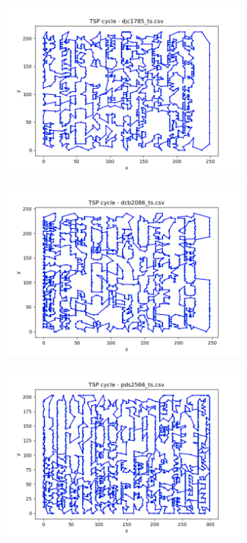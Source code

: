 \documentclass[12pt]{article}
\begin{document}
\begin{figure}[htpb]
\begin{subfigure}[b]{0.475\textwidth}
                \includegraphics[width=\linewidth]{img/djc1785_ts.png}
            \end{subfigure}
            \hfill
            \begin{subfigure}[b]{0.475\textwidth}
                \includegraphics[width=\linewidth]{img/dcb2086_ts.png}
            \end{subfigure}
            \begin{subfigure}[b]{0.475\textwidth}
                \includegraphics[width=\linewidth]{img/pds2566_ts.png}

\end{subfigure}
\end{figure}
\end{document}
